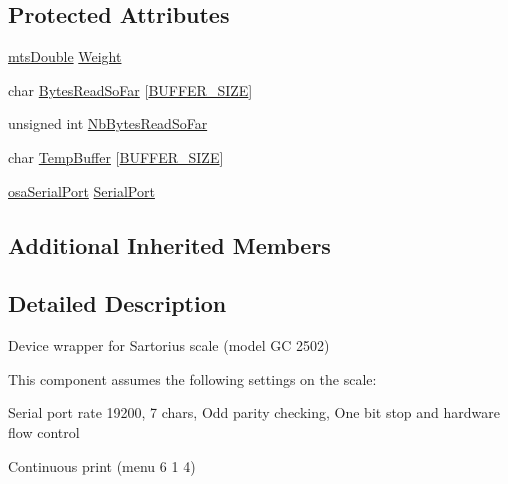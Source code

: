 \subsection*{Protected Attributes}
\begin{DoxyCompactItemize}
\item 
\hyperlink{mts_generic_object_proxy_8h_a31e76b0190a8d3f9838626cd7b47bd75}{mts\-Double} \hyperlink{classmts_sartorius_serial_a5fd5e0fcfe8b161a1663059026bcd298}{Weight}
\item 
char \hyperlink{classmts_sartorius_serial_ae348c055cadd8ffe27284c8e2a9924d5}{Bytes\-Read\-So\-Far} \mbox{[}\hyperlink{classmts_sartorius_serial_a3d845ebc5b0ea91a687044140a7b257aa7a2c0b5e39b999002353c52f30f82d1f}{B\-U\-F\-F\-E\-R\-\_\-\-S\-I\-Z\-E}\mbox{]}
\item 
unsigned int \hyperlink{classmts_sartorius_serial_a124551b1b4929356d1b40d78666316ed}{Nb\-Bytes\-Read\-So\-Far}
\item 
char \hyperlink{classmts_sartorius_serial_a0b786c0a9cf4fbefff9d6727c9f6fd56}{Temp\-Buffer} \mbox{[}\hyperlink{classmts_sartorius_serial_a3d845ebc5b0ea91a687044140a7b257aa7a2c0b5e39b999002353c52f30f82d1f}{B\-U\-F\-F\-E\-R\-\_\-\-S\-I\-Z\-E}\mbox{]}
\item 
\hyperlink{classosa_serial_port}{osa\-Serial\-Port} \hyperlink{classmts_sartorius_serial_af266db2d34490ee1fe17c10b8aba6be8}{Serial\-Port}
\end{DoxyCompactItemize}
\subsection*{Additional Inherited Members}


\subsection{Detailed Description}
Device wrapper for Sartorius scale (model G\-C 2502) 

This component assumes the following settings on the scale\-:
\begin{DoxyItemize}
\item Serial port rate 19200, 7 chars, Odd parity checking, One bit stop and hardware flow control
\item Continuous print (menu 6 1 4) 
\end{DoxyItemize}

